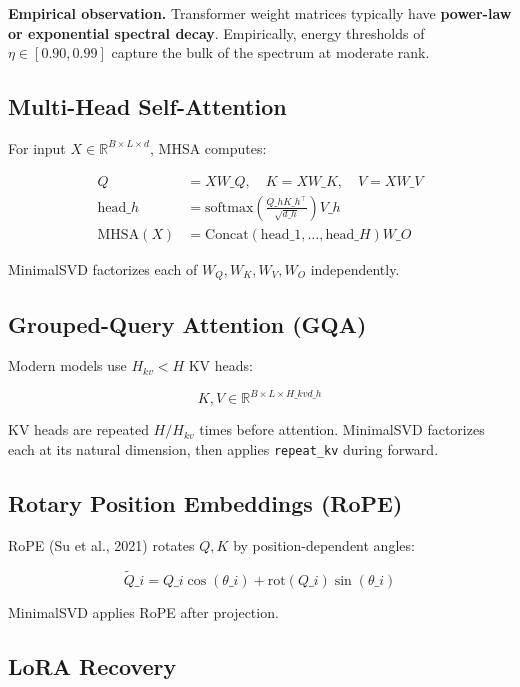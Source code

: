\textbf{Empirical observation.} Transformer weight matrices typically have 
\textbf{power-law or exponential spectral decay}. Empirically, energy thresholds 
of $\eta \in [0.90, 0.99]$ capture the bulk of the spectrum at moderate rank.

\subsection{Multi-Head Self-Attention}

For input $X \in \mathbb{R}^{B \times L \times d}$, MHSA computes:

\[
\begin{aligned}
Q &= X W\_Q, \quad K = X W\_K, \quad V = X W\_V \\
\text{head}\_h &= \text{softmax}\!\left(\frac{Q\_h K\_h^\top}{\sqrt{d\_h}}\right) V\_h \\
\text{MHSA}(X) &= \text{Concat}(\text{head}\_1, \dots, \text{head}\_H) W\_O
\end{aligned}
\tag{3.7}
\]

MinimalSVD factorizes each of $W_Q, W_K, W_V, W_O$ independently.

\subsection{Grouped-Query Attention (GQA)}

Modern models use $H_{kv} < H$ KV heads:

\[
K, V \in \mathbb{R}^{B \times L \times H\_{kv} d\_h}
\tag{3.8}
\]

KV heads are repeated $H / H_{kv}$ times before attention. MinimalSVD 
factorizes each at its natural dimension, then applies \texttt{repeat\_kv} during 
forward.

\subsection{Rotary Position Embeddings (RoPE)}

RoPE (Su et al., 2021) rotates $Q, K$ by position-dependent angles:

\[
\tilde{Q}\_i = Q\_i \cos(\theta\_i) + \text{rot}(Q\_i) \sin(\theta\_i)
\tag{3.9}
\]

MinimalSVD applies RoPE after projection.

\subsection{LoRA Recovery}


